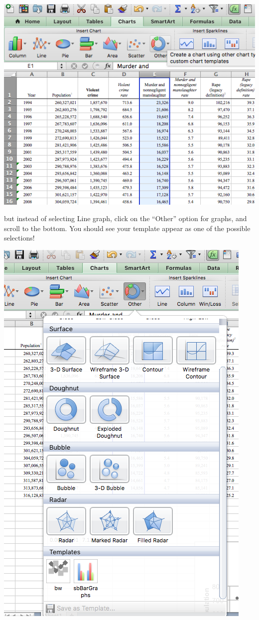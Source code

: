 \documentclass[
]{book}
\begin{document}
\includegraphics{imgs/select_mm_col.png}

but instead of selecting Line graph, click on the ``Other'' option for graphs, and scroll to the bottom. You should see your template appear as one of the possible selections!

\includegraphics{imgs/choose_template.png}
\end{document}
